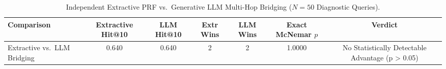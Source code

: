 \begin{table}[t]
\centering\small
\caption{Independent Extractive PRF vs.\ Generative LLM Multi-Hop Bridging ($N=50$ Diagnostic Queries).}\label{tab:multihop_v6}
\begin{tabular}{lcccccc}
\toprule
Comparison & Extractive Hit@10 & LLM Hit@10 & Extr Wins & LLM Wins & Exact McNemar $p$ & Verdict \\
\midrule
Extractive vs.\ LLM Bridging & 0.640 & 0.640 & 2 & 2 & 1.0000 & No Statistically Detectable Advantage (p > 0.05) \\
\bottomrule
\end{tabular}
\end{table}
